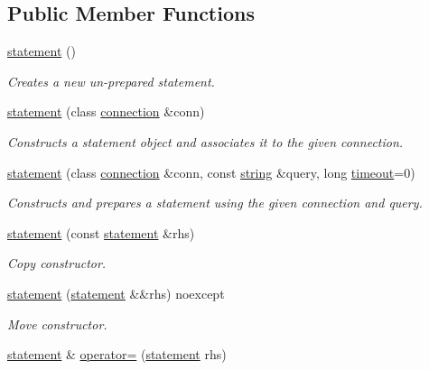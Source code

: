 \subsection*{Public Member Functions}
\begin{DoxyCompactItemize}
\item 
\mbox{\hyperlink{classnanodbc_1_1statement_ac9ea91624b4b6136f98b002f75376cd9}{statement}} ()
\begin{DoxyCompactList}\small\item\em Creates a new un-\/prepared statement. \end{DoxyCompactList}\item 
\mbox{\hyperlink{classnanodbc_1_1statement_aaa2dbe21f428c67d7dd32b9d8eeb8877}{statement}} (class \mbox{\hyperlink{classnanodbc_1_1connection}{connection}} \&conn)
\begin{DoxyCompactList}\small\item\em Constructs a statement object and associates it to the given connection. \end{DoxyCompactList}\item 
\mbox{\hyperlink{classnanodbc_1_1statement_a81bee831e734bedb4fbedd4cbf1a238f}{statement}} (class \mbox{\hyperlink{classnanodbc_1_1connection}{connection}} \&conn, const \mbox{\hyperlink{namespacenanodbc_abfc0ece56278e590911ec8352774c212}{string}} \&query, long \mbox{\hyperlink{classnanodbc_1_1statement_adbd1acbbdcc529dc668bfef341593573}{timeout}}=0)
\begin{DoxyCompactList}\small\item\em Constructs and prepares a statement using the given connection and query. \end{DoxyCompactList}\item 
\mbox{\hyperlink{classnanodbc_1_1statement_a78cdb0dbf1437cd98eff448e8c6a8757}{statement}} (const \mbox{\hyperlink{classnanodbc_1_1statement}{statement}} \&rhs)
\begin{DoxyCompactList}\small\item\em Copy constructor. \end{DoxyCompactList}\item 
\mbox{\hyperlink{classnanodbc_1_1statement_a99b7708d308ee9313f5879ed09750fdf}{statement}} (\mbox{\hyperlink{classnanodbc_1_1statement}{statement}} \&\&rhs) noexcept
\begin{DoxyCompactList}\small\item\em Move constructor. \end{DoxyCompactList}\item 
\mbox{\hyperlink{classnanodbc_1_1statement}{statement}} \& \mbox{\hyperlink{classnanodbc_1_1statement_aaaa08f3783cb111c4426d42ae8d1ecd3}{operator=}} (\mbox{\hyperlink{classnanodbc_1_1statement}{statement}} rhs)

\end{DoxyCompactItemize}
